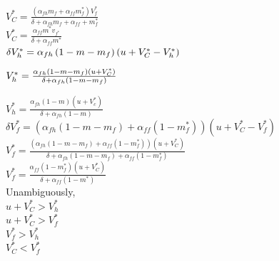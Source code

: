 $V _{C}^* = \frac{\left(\alpha _{fh}m_{f} + \alpha_{ff} m_{f}^* \right) V _ { f } ^ * } { \delta + \alpha _ { fh }  m _ { f } + \alpha _ { ff } + m _ { f } ^ { * } }$ \\ 

$V _ { C } ^ { * } = \frac { \alpha _ { ff } m ^ { * } v _ { f ^ { * } } } { \delta + \alpha_{ f f} m ^ { * } }$\\


$ \delta V _ { h  }^ { * }   = \alpha _ { f h } \left( 1 - m - m _ { f } \right) \left( u + V _ { C } ^ { * } - V _ { h } ^ { * } \right)   \\ $

$ V _ { h  }^ { * }   = \frac{\alpha _ { f h } \left( 1 - m - m _ { f } \right) \left( u + V _ { C } ^ { * }\right) }{\delta + \alpha _ { fh } \left( 1 -m- m _ { f } \right) }   \\ $

$V _ { h } ^ { * } = \frac { \alpha _ { f h } ( 1 - m ) \left( u + V _ { c } ^ { * } \right) } { \delta + \alpha_{f h} ( 1 - m ) }$ \\

$ \delta V _ { f } ^ { * }  = \left(\alpha _ { f h } \left( 1 - m - m _ { f } \right) + \alpha_ { ff } \left( 1 - m _ { f } ^ { * } \right) \right) \left( u + V _ { C  }^ { * }-V_f^* \right)   $\\

$ V _ { f } ^ { * }  = \frac {\left(\alpha _ { f h } \left( 1 - m - m _ { f } \right) + \alpha_ { ff } \left( 1 - m _ { f } ^ { * } \right) \right) \left( u + V _ { C  }^ { * } \right) } { \delta+ \alpha _ { f h } \left( 1 - m - m _ { f } \right) + \alpha _{ff} \left( 1 - m _ { f }^ { * }  \right) }  $\\


$ V _ { f  }^ { * } = \frac {  \alpha _ { ff } \left( 1  - m^* _ { f } \right) \left( u + V _ { C } ^ { * } \right) } { \delta + \alpha _ { f f } \left( 1  - m ^* \right) } $\\

Unambiguously,\\

 $u + V_C ^ { * } > V_h ^ { * }$ \\
 
 $u + V_C ^ { * } > V _ { f } ^ { * }$ \\ 
 
 $V _ { f } ^ { * } > V_h ^ { * }$ \\ 
 
 $V _ { C } ^ { * } < V _ { f } ^ { * } $\\


